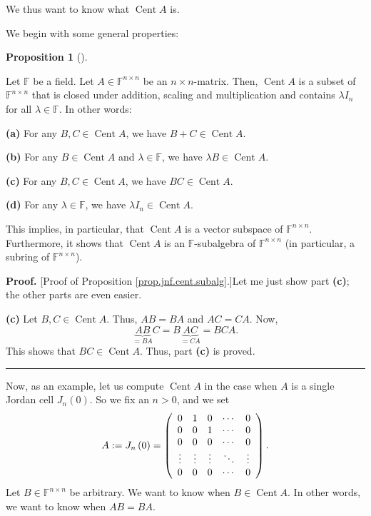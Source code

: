 \documentclass[numbers=enddot,12pt,final,onecolumn,notitlepage]{scrartcl}%
\numberwithin{exer}{subsection}
\theoremstyle{definition}
\newtheorem{prop}[theo]{Proposition}
\newenvironment{proposition}[1][]
{\begin{prop}[#1]\begin{leftbar}}
{\end{leftbar}\end{prop}}
\newenvironment{proof}[1][Proof]{\noindent\textbf{#1.} }{\ \rule{0.5em}{0.5em}}
\begin{document}
We thus want to know what $\operatorname*{Cent}A$ is.

We begin with some general properties:

\begin{proposition}
\label{prop.jnf.cent.subalg}Let $\mathbb{F}$ be a field. Let $A\in
\mathbb{F}^{n\times n}$ be an $n\times n$-matrix. Then, $\operatorname*{Cent}%
A$ is a subset of $\mathbb{F}^{n\times n}$ that is closed under addition,
scaling and multiplication and contains $\lambda I_{n}$ for all $\lambda
\in\mathbb{F}$. In other words:

\textbf{(a)} For any $B,C\in\operatorname*{Cent}A$, we have $B+C\in
\operatorname*{Cent}A$.

\textbf{(b)} For any $B\in\operatorname*{Cent}A$ and $\lambda\in\mathbb{F}$,
we have $\lambda B\in\operatorname*{Cent}A$.

\textbf{(c)} For any $B,C\in\operatorname*{Cent}A$, we have $BC\in
\operatorname*{Cent}A$.

\textbf{(d)} For any $\lambda\in\mathbb{F}$, we have $\lambda I_{n}%
\in\operatorname*{Cent}A$.
\end{proposition}

This implies, in particular, that $\operatorname*{Cent}A$ is a vector subspace
of $\mathbb{F}^{n\times n}$. Furthermore, it shows that $\operatorname*{Cent}%
A$ is an $\mathbb{F}$-subalgebra of $\mathbb{F}^{n\times n}$ (in particular, a
subring of $\mathbb{F}^{n\times n}$).

\begin{proof}
[Proof of Proposition \ref{prop.jnf.cent.subalg}.]Let me just show part
\textbf{(c)}; the other parts are even easier.

\textbf{(c)} Let $B,C\in\operatorname*{Cent}A$. Thus, $AB=BA$ and $AC=CA$.
Now,%
\[
\underbrace{AB}_{=BA}C=B\underbrace{AC}_{=CA}=BCA.
\]
This shows that $BC\in\operatorname*{Cent}A$. Thus, part \textbf{(c)} is proved.
\end{proof}

Now, as an example, let us compute $\operatorname*{Cent}A$ in the case when
$A$ is a single Jordan cell $J_{n}\left(  0\right)  $. So we fix an $n>0$, and
we set%
\[
A:=J_{n}\left(  0\right)  =\left(
\begin{array}
[c]{ccccc}%
0 & 1 & 0 & \cdots & 0\\
0 & 0 & 1 & \cdots & 0\\
0 & 0 & 0 & \cdots & 0\\
\vdots & \vdots & \vdots & \ddots & \vdots\\
0 & 0 & 0 & \cdots & 0
\end{array}
\right)  .
\]
Let $B\in\mathbb{F}^{n\times n}$ be arbitrary. We want to know when
$B\in\operatorname*{Cent}A$. In other words, we want to know when $AB=BA$.
\end{document}
